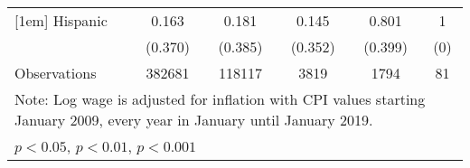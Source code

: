 \begin{table}[htbp]
\begin{tabular}{l*{5}{c}}
[1em]
Hispanic            &       0.163         &       0.181         &       0.145         &       0.801         &           1         \\
                    &     (0.370)         &     (0.385)         &     (0.352)         &     (0.399)         &         (0)         \\
\hline
Observations        &      382681         &      118117         &        3819         &        1794         &          81         \\
\hline\hline
\multicolumn{6}{l}{\footnotesize Note: Log wage is adjusted for inflation with CPI values starting January 2009, every year in January until January 2019.}\\
\multicolumn{6}{l}{\footnotesize \sym{*} \(p<0.05\), \sym{**} \(p<0.01\), \sym{***} \(p<0.001\)}\\
\end{tabular}
\end{table}
